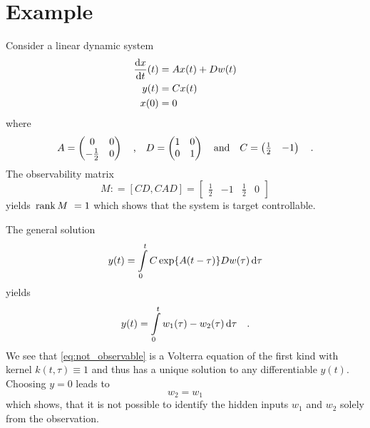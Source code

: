 \section{Example}
Consider a linear dynamic system
\begin{align}
\frac{\text{d} x}{\text{d} t}(t) &= Ax(t) + Dw(t) \\
y(t) &= C x(t)\\
x(0)& = 0
\end{align}
where
\begin{equation}
A=\begin{pmatrix}
0 & 0 \\ -\frac{1}{2} & 0 
\end{pmatrix} \quad \text{,} \quad
D = \begin{pmatrix}
1 & 0 \\ 0 & 1
\end{pmatrix} \quad \text{and} \quad
C = \begin{pmatrix}
\frac{1}{2} & -1
\end{pmatrix} \quad .
\end{equation}
The observability matrix 
\begin{equation}
M: = [CD,CAD] = \begin{bmatrix}
\frac12&-1&\frac12&0
\end{bmatrix}
\end{equation}
yields $ \, \text{rank}\,M \,\, =1$ which shows that the system is target controllable.

\begin{remark}
The general solution 
\begin{equation}
y(t) = \int\limits_0^t C\exp\{A(t-\tau)\} Dw(\tau) \, \text{d} \tau
\end{equation}
yields
\begin{equation}
y(t) = \int\limits_0^t 
w_1(\tau) - w_2(\tau) \, \text{d} \tau \label{eq:not_observable} \quad .
\end{equation}
We see that \eqref{eq:not_observable} is a Volterra equation of the first kind with 
kernel $k(t,\tau)\equiv 1$ and thus has a unique solution to any differentiable $y(t)$. 
Choosing $y = 0$ leads to
\begin{equation}
w_2 = w_1
\end{equation}
which shows, that it is not possible to identify the hidden inputs $w_1$ and $w_2$ solely 
from the observation. 
\end{remark}